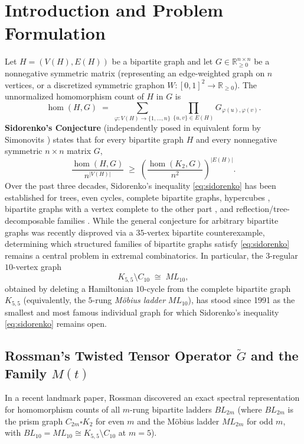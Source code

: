 \documentclass[11pt,a4paper]{article}
\theoremstyle{plain}
\theoremstyle{definition}
\theoremstyle{remark}
\DeclareMathOperator{\homop}{hom}
\begin{document}
\section{Introduction and Problem Formulation}

Let $H = (V(H), E(H))$ be a bipartite graph and let $G \in \mathbb{R}_{\ge 0}^{n \times n}$ be a nonnegative symmetric matrix (representing an edge-weighted graph on $n$ vertices, or a discretized symmetric graphon $W : [0,1]^2 \to \mathbb{R}_{\ge 0}$). The unnormalized homomorphism count of $H$ in $G$ is
\[
  \homop(H, G) \;=\; \sum_{\varphi : V(H) \to \{1,\dots,n\}} \prod_{\{u,v\} \in E(H)} G_{\varphi(u),\varphi(v)}.
\]
\textbf{Sidorenko's Conjecture} \cite{Sidorenko1991} (independently posed in equivalent form by Simonovits \cite{Simonovits1984}) states that for every bipartite graph $H$ and every nonnegative symmetric $n \times n$ matrix $G$,
\begin{equation}\label{eq:sidorenko}
  \frac{\homop(H, G)}{n^{|V(H)|}} \;\ge\; \left(\frac{\homop(K_2, G)}{n^2}\right)^{|E(H)|}.
\end{equation}
Over the past three decades, Sidorenko's inequality \eqref{eq:sidorenko} has been established for trees, even cycles, complete bipartite graphs, hypercubes \cite{Hatami2010}, bipartite graphs with a vertex complete to the other part \cite{ConlonFoxSudakov2010}, and reflection/tree-decomposable families \cite{Szegedy2015,ConlonKimLeeLee2018}. While the general conjecture for arbitrary bipartite graphs was recently disproved via a $35$-vertex bipartite counterexample, determining which structured families of bipartite graphs satisfy \eqref{eq:sidorenko} remains a central problem in extremal combinatorics. In particular, the $3$-regular $10$-vertex graph
\[
  K_{5,5} \setminus C_{10} \;\cong\; ML_{10},
\]
obtained by deleting a Hamiltonian $10$-cycle from the complete bipartite graph $K_{5,5}$ (equivalently, the $5$-rung \emph{M\"obius ladder} $ML_{10}$), has stood since 1991 as the smallest and most famous individual graph for which Sidorenko's inequality \eqref{eq:sidorenko} remains open.

\subsection{Rossman's Twisted Tensor Operator \texorpdfstring{$\widetilde{G}$}{G-tilde} and the Family \texorpdfstring{$M(t)$}{M(t)}}

In a recent landmark paper, Rossman \cite{Rossman2025} discovered an exact spectral representation for homomorphism counts of all $m$-rung bipartite ladders $BL_{2m}$ (where $BL_{2m}$ is the prism graph $C_{2m} \square K_2$ for even $m$ and the M\"obius ladder $ML_{2m}$ for odd $m$, with $BL_{10} = ML_{10} \cong K_{5,5} \setminus C_{10}$ at $m = 5$).
\end{document}
